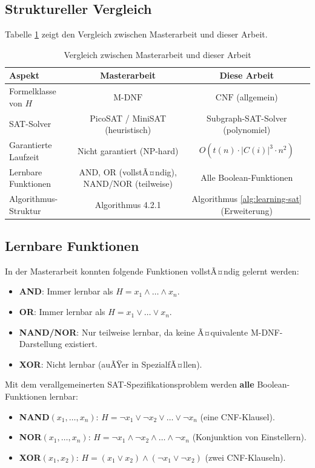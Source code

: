 ﻿\documentclass[a4paper,12pt]{article}
\theoremstyle{definition}
\begin{document}
\subsection{Struktureller Vergleich}
Tabelle \ref{tab:vergleich} zeigt den Vergleich zwischen Masterarbeit und dieser Arbeit.
\begin{table}
    \begin{tabular}{|l|c|c|}
        \hline
        \textbf{Aspekt} & \textbf{Masterarbeit \cite{Epp13}} & \textbf{Diese Arbeit} \\
        \hline
        Formelklasse von $H$ & $\text{M-DNF}$ & $\text{CNF}$ (allgemein) \\
        SAT-Solver & PicoSAT / MiniSAT (heuristisch) & Subgraph-SAT-Solver (polynomiel) \\
        Garantierte Laufzeit & Nicht garantiert (NP-hard) & $O(t(n) \cdot |C(i)|^3 \cdot n^2)$ \\
        Lernbare Funktionen & AND, OR (vollstÃ¤ndig), NAND/NOR (teilweise) & Alle Boolean-Funktionen \\
        Algorithmus-Struktur & Algorithmus 4.2.1 & Algorithmus \ref{alg:learning-sat} (Erweiterung) \\
        \hline
    \end{tabular}
    \caption{Vergleich zwischen Masterarbeit und dieser Arbeit}
    \label{tab:vergleich}
\end{table}

\subsection{Lernbare Funktionen}

In der Masterarbeit konnten folgende Funktionen vollstÃ¤ndig gelernt werden:
\begin{itemize}
    \item[-] \textbf{AND}: Immer lernbar als $H = x_1 \wedge \ldots \wedge x_n$.
    \item[-] \textbf{OR}: Immer lernbar als $H = x_1 \lor \ldots \lor x_n$.
    \item[-] \textbf{NAND/NOR}: Nur teilweise lernbar, da keine Ã¤quivalente M-DNF-Darstellung existiert.
    \item[-] \textbf{XOR}: Nicht lernbar (auÃŸer in SpezialfÃ¤llen).
\end{itemize}

Mit dem verallgemeinerten SAT-Spezifikationsproblem werden \textbf{alle} Boolean-Funktionen lernbar:
\begin{itemize}
    \item[-] \textbf{NAND$(x_1, \ldots, x_n)$}: $H = \neg x_1 \lor \neg x_2 \lor \ldots \lor \neg x_n$ (eine CNF-Klausel).
    \item[-] \textbf{NOR$(x_1, \ldots, x_n)$}: $H = \neg x_1 \wedge \neg x_2 \wedge \ldots \wedge \neg x_n$ (Konjunktion von Einstellern).
    \item[-] \textbf{XOR$(x_1, x_2)$}: $H = (x_1 \lor x_2) \wedge (\neg x_1 \lor \neg x_2)$ (zwei CNF-Klauseln).
\end{itemize}
\end{document}
